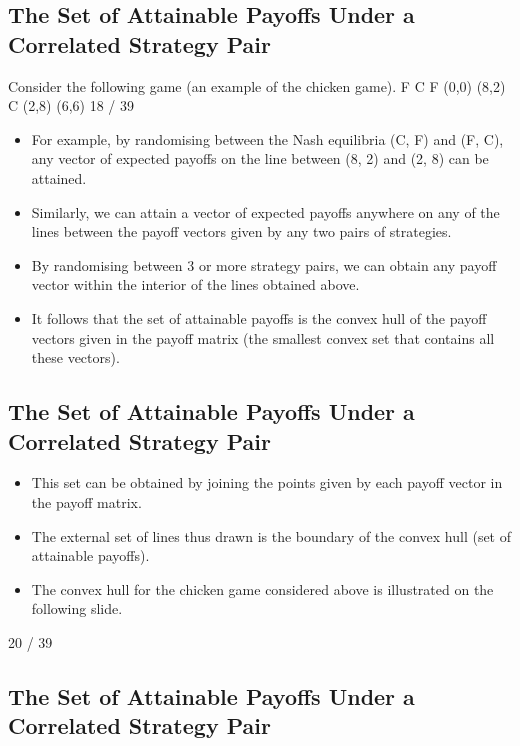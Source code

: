 \documentclass[]{report}
\begin{document}
\subsection{The Set of Attainable Payoffs Under a Correlated Strategy
Pair}
Consider the following game (an example of the chicken game).
F C
F (0,0) (8,2)
C (2,8) (6,6)
18 / 39

\begin{itemize}
\item For example, by randomising between the Nash equilibria (C, F)
and (F, C), any vector of expected payoffs on the line between
(8, 2) and (2, 8) can be attained.
\item  Similarly, we can attain a vector of expected payoffs anywhere on
any of the lines between the payoff vectors given by any two pairs
of strategies.
\item  By randomising between 3 or more strategy pairs, we can obtain
any payoff vector within the interior of the lines obtained above.
\item  It follows that the set of attainable payoffs is the convex hull of the
payoff vectors given in the payoff matrix (the smallest convex set
that contains all these vectors).
\end{itemize}

\subsection{The Set of Attainable Payoffs Under a Correlated Strategy
Pair}
\begin{itemize}
	\item This set can be obtained by joining the points given by each payoff
	vector in the payoff matrix.
	\item 	The external set of lines thus drawn is the boundary of the convex
	hull (set of attainable payoffs).
	\item 	The convex hull for the chicken game considered above is
	illustrated on the following slide.
\end{itemize}

20 / 39
\subsection{The Set of Attainable Payoffs Under a Correlated Strategy
	Pair}
\end{document}
